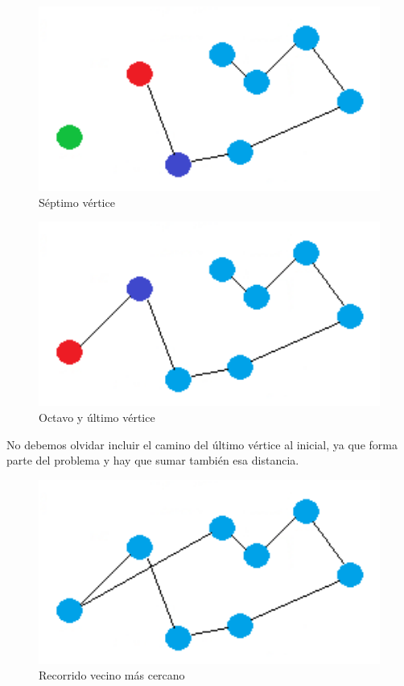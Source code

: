 \begin{figure}[htb] 
	\centering
	\includegraphics[width=1.75\textwidth]{./Imagenes/vecino6.png}
	\caption{Séptimo vértice} 
\end{figure}

\begin{figure}[htb] 
	\centering
	\includegraphics[width=1.75\textwidth]{./Imagenes/vecino7.png}
	\caption{Octavo y último vértice} 
\end{figure}

No debemos olvidar incluir el camino del último vértice al inicial, ya que forma parte del problema y hay que sumar también esa distancia.

\begin{figure}[htb] 
	\centering
	\includegraphics[width=1.75\textwidth]{./Imagenes/vecino8.png}
	\caption{Recorrido vecino más cercano} 
\end{figure}

